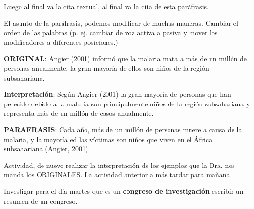 \documentclass{article}
\begin{document}
 Luego al final va la cita textual, al final va la cita de esta paráfrasis. 
 
 El asunto de la paráfrasis, podemos modificar de muchas maneras. Cambiar el orden de las palabras (p. ej. cambiar de voz activa a pasiva y mover los modificadores a diferentes posiciones.)
 
 \textbf{ORIGINAL}: Angier (2001) informó que la malaria mata a más de un millón de personas anualmente, la gran mayoría de ellos son niños de la región subsahariana. 
 
 \textbf{Interpretación}: Según Angier (2001) la gran mayoría de personas que han perecido debido a la malaria son principalmente niños de la región subsahariana y representa más de un millón de casos anualmente. 
 
 
 \textbf{PARAFRASIS}: Cada año, más de un millón de personas muere a causa de la malaria, y la mayoría ed las víctimas son niños que viven en el África subsahariana (Angier, 2001).
 
 
 Actividad, de nuevo realizar la interpretación de los ejemplos que la Dra. nos manda los ORIGINALES.
 La actividad anterior a más tardar para mañana.
 
 Investigar para el día martes que es un \textbf{congreso de investigación} escribir un resumen de un congreso.  


  
\end{document}
